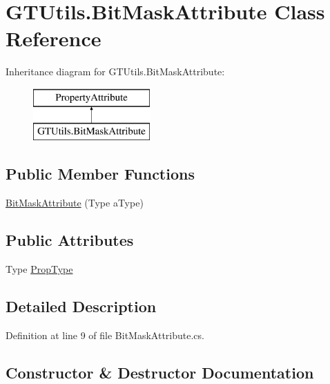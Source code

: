 \hypertarget{class_g_t_utils_1_1_bit_mask_attribute}{}\section{G\+T\+Utils.\+Bit\+Mask\+Attribute Class Reference}
\label{class_g_t_utils_1_1_bit_mask_attribute}
Inheritance diagram for G\+T\+Utils.\+Bit\+Mask\+Attribute\+:\begin{figure}[H]
\begin{center}
\leavevmode
\includegraphics[height=2.000000cm]{class_g_t_utils_1_1_bit_mask_attribute}
\end{center}
\end{figure}
\subsection*{Public Member Functions}
\begin{DoxyCompactItemize}
\item 
\hyperlink{class_g_t_utils_1_1_bit_mask_attribute_a58c36d0115ac3e94ee7d8fe257ed5657}{Bit\+Mask\+Attribute} (Type a\+Type)
\end{DoxyCompactItemize}
\subsection*{Public Attributes}
\begin{DoxyCompactItemize}
\item 
Type \hyperlink{class_g_t_utils_1_1_bit_mask_attribute_aa3618cef4c4eb873925f88fe625456ad}{Prop\+Type}
\end{DoxyCompactItemize}


\subsection{Detailed Description}


Definition at line 9 of file Bit\+Mask\+Attribute.\+cs.



\subsection{Constructor \& Destructor Documentation}
\hypertarget{class_g_t_utils_1_1_bit_mask_attribute_a58c36d0115ac3e94ee7d8fe257ed5657}{}
